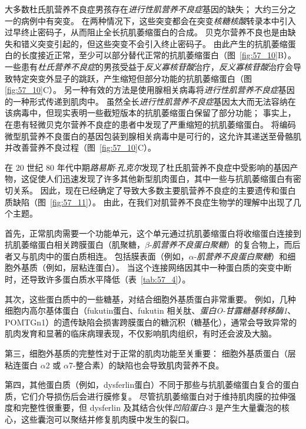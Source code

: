 大多数杜氏肌营养不良症男孩存在\textit{进行性肌营养不良症}基因的缺失；
大约三分之一的病例中有突变。
在两种情况下，这些突变都会在突变\textit{核糖核酸}转录本中引入过早终止密码子，从而阻止全长抗肌萎缩蛋白的合成。
贝克尔营养不良也是由缺失和错义突变引起的，但这些突变不会引入终止密码子。
由此产生的抗肌萎缩蛋白的长度接近正常，至少可以部分替代正常的抗肌萎缩蛋白（图~\ref{fig:57_10}B）。
一些患有\textit{杜氏营养不良症}的男孩受益于\textit{反义寡核苷酸}治疗，\textit{反义寡核苷酸}治疗会导致特定突变外显子的跳跃，产生缩短但部分功能的抗肌萎缩蛋白（图 \ref{fig:57_10}C）。
另一种有效的方法是使用腺相关病毒将\textit{进行性肌营养不良症}基因的一种形式传递到肌肉中。
虽然全长\textit{进行性肌营养不良症}基因太大而无法容纳在该病毒中，但现实表明一些截短版本的抗肌萎缩蛋白保留了部分功能；
事实上，在患有轻微贝克尔营养不良症的患者中发现了严重缩短的抗肌萎缩蛋白。
将编码微型肌营养不良蛋白的基因包装到腺相关病毒中是可行的，这允许其递送至骨骼肌并改善营养不良过程（图~\ref{fig:57_10}C）。


在 20 世纪 80 年代中期\textit{路易斯$\cdot$孔克尔}发现了杜氏肌营养不良症中受影响的基因产物，这促使人们迅速发现了许多其他新型肌肉蛋白，其中一些与抗肌萎缩蛋白有密切关系。
因此，现在已经确定了导致大多数主要肌营养不良症的主要遗传和蛋白质缺陷（图~\ref{fig:57_11}）。
由此，在我们对肌营养不良症生物学的理解中出现了几个主题。


首先，正常肌肉需要一个功能单元，这个单元通过抗肌萎缩蛋白将收缩蛋白连接到抗肌萎缩蛋白相关跨膜蛋白（肌聚糖，$\beta $-\textit{肌营养不良蛋白聚糖}）的复合物上，而后者又与肌肉中的蛋白质相连。
包括膜表面（例如，$\alpha$-\textit{肌营养不良蛋白聚糖}）和细胞外基质（例如，层粘连蛋白）。
当这个连接网络因其中一种蛋白质的突变中断时，还导致许多蛋白质水平降低（表~\ref{tab:57_4}）。


其次，这些蛋白质中的一些糖基，对结合细胞外基质蛋白非常重要。
例如，几种细胞内高尔基体蛋白（fukutin蛋白、fukutin 相关肽、\textit{蛋白O-甘露糖基转移酶1}、POMTGn1）的遗传缺陷会损害跨膜蛋白的糖沉积（糖基化），通常会导致异常的肌肉发育和显著的临床病理表现，不仅影响肌肉组织，有时还会波及大脑。


第三，细胞外基质的完整性对于正常的肌肉功能至关重要：
细胞外基质蛋白（层粘连蛋白 $\alpha$2 或 $\alpha$7-整合素）的缺陷也会导致肌肉营养不良。


第四，其他蛋白质（例如，dysferlin蛋白）不同于那些与抗肌萎缩蛋白复合的蛋白质，它们介导损伤后会进行膜修复。
尽管抗肌萎缩蛋白对于维持肌肉膜的拉伸强度和完整性很重要，但 dysferlin 及其结合伙伴\textit{凹陷蛋白}-3 是产生大量囊泡的核心，这些囊泡可以聚结并修复肌肉膜中发生的裂口。


